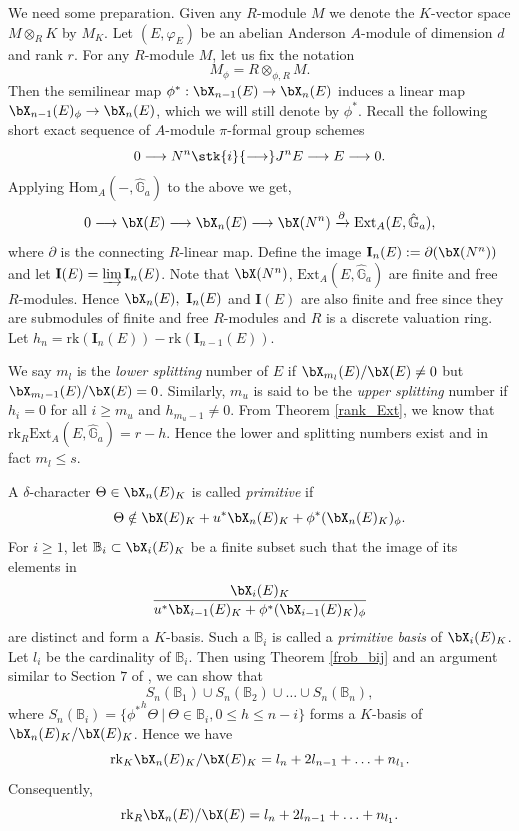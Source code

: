 \documentclass{amsart}
\def \d{\delta}
\numberwithin {equation}{section}
\def \d{\delta} \def \bZ{{\mathbb Z}} \def \bV{{\mathcal V}} \def \bF{{\bf F}}
\begin{document}
We need some preparation.
Given any $R$-module $M$ we denote  the $K$-vector space $M\otimes _{R}K$  by 
$M_{K}$.
Let $(E,\varphi_{E})$ be an abelian Anderson $A$-module of dimension $d$ and rank $r$. For any $R$-module $M$, let us fix the notation
	$$
	M_{\phi} = R\otimes_{\phi,R}M.
	$$
Then the semilinear map $\phi^*:{\bX}_{n-1}(E) \rightarrow {\bX}_n(E)$ induces a linear map
${\bX}_{n-1}(E)_{\phi}\rightarrow {\bX}_n(E)$, which we will still denote by $\phi^*$. Recall the following short exact sequence of $A$-module $\pi$-formal 
group schemes
$$0\longrightarrow N^{n} \stk{i}{\longrightarrow} J^{n}E \longrightarrow E \longrightarrow 0.$$
Applying $\mathrm{Hom}_{A}(-,\hat{\mathbb{G}}_{a})$ to the above we get,
$$0\longrightarrow \bX(E)\longrightarrow {\bX}_{n}(E) \longrightarrow {\bX}(N^{n})\xrightarrow{\partial} \mathrm{Ext}_{A}(E,\hat{\mathbb{G}}_{a}), $$
where $\partial$ is the connecting $R$-linear map.
Define the image  $\mathbf{I}_{n}(E):=\partial ({\bX}(N^{n}))$ and let
${\mathbf{I}}(E)= \varinjlim {\mathbf{I}}_n(E)$. Note that  
${\bX}(N^{n})$, $\mathrm{Ext}_{A}(E,\hat{\mathbb{G}}_{a})$ are  finite and
free $R$-modules. Hence ${\bX}_{n}(E), ~\mathbf{I}_{n}(E)$ and ${\mathbf{I}}(E)$ 
 are also finite and free since they are submodules of finite and free $R$-modules and $R$ is a discrete valuation ring. Let $h_{n}=\mathrm{rk}(\mathbf{I}_{n}(E))-\mathrm{rk} (\mathbf{I}_{n-1}(E))$.

We say $m_{l}$ is the \emph{lower splitting} number of $E$ if ${\bX}_{m_{l}}(E)/\bX(E)\neq 0$ but ${\bX}_{m_{l}-1}(E)/\bX(E)= 0$. Similarly, $m_{u}$ is said to be the 
\emph{upper splitting} number if $h_{i}=0$ for all $i\geq m_{u}$ and $h_{m_{u}-1}\neq 0$.
From Theorem \ref{rank_Ext}, we know that  $\mathrm{rk}_R \mathrm{Ext}_{A}(E,\hat{\mathbb{G}}_{a})=r-h$. Hence the lower and splitting numbers exist and in fact $m_{l}\leq s$.\medskip


 A $\d$-character $\Theta \in {\bX}_{n}(E)_{K} $ is called \emph{primitive} if $$\Theta \notin \bX(E)_{K}+ u^{*}{\bX}_{n}(E)_{K}+\phi^{*}({\bX}_{n}(E)_{K})_{\phi}.$$
For $i\geq 1$, let $\mathbb{B}_{i}\subset {\bX}_{i}(E)_{K}$ be a finite subset such that the image of its elements in $$\dfrac{{\bX}_{i}(E)_{K}}{u^{*}{\bX}_{i-1}(E)_{K}+\phi^{*}({\bX}_{i-1}(E)_{K})_{\phi}}$$ are distinct and form a $K$-basis. Such a $\mathbb{B}_{i}$ is called a \emph{primitive basis} of ${\bX}_{i}(E)_{K}$. Let $l_{i}$ be the cardinality of $\mathbb{B}_{i}$. 
 Then using Theorem \ref{frob_bij} and an argument similar to Section $7$ of \cite{BS a}, we can show that  
$$ S_{n}(\mathbb{B}_{1})\cup S_{n}(\mathbb{B}_{2})\cup \ldots \cup S_{n}(\mathbb{B}_{n}) ,$$
where $S_{n}(\mathbb{B}_{i})=\{{\phi^{*}}^{h}\Theta ~|~ \Theta\in \mathbb{B}_{i}, 0\leq h\leq n-i \} $ forms a $K$-basis of $\bX_n(E)_K/\bX(E)_{K}$.
Hence we have $$\mathrm{rk}_K {\bX}_{n}(E)_{K}/\bX(E)_{K}=l_{n}+2l_{n-1}+\ldots + n_{l_{1}}.$$
Consequently,
$$\mathrm{rk}_R {\bX}_{n}(E)/\bX(E)=l_{n}+2l_{n-1}+\ldots + n_{l_{1}}.$$ 
\end{document}
